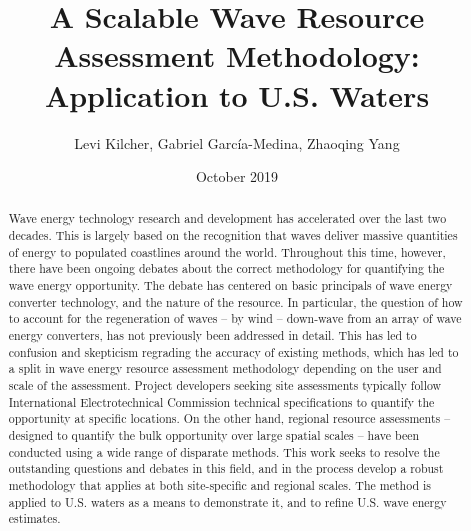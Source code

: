\documentclass[authoryear,preprint]{elsarticle}
\title{A Scalable Wave Resource Assessment Methodology: Application to U.S. Waters}
\author{Levi Kilcher, Gabriel Garc\'ia-Medina, Zhaoqing Yang}
\date{October 2019}
\begin{document}
\begin{abstract}
Wave energy technology research and development has accelerated over the last two decades. This is largely based on the recognition that waves deliver massive quantities of energy to populated coastlines around the world. Throughout this time, however, there have been ongoing debates about the correct methodology for quantifying the wave energy opportunity. The debate has centered on basic principals of wave energy converter technology, and the nature of the resource. In particular, the question of how to account for the regeneration of waves -- by wind -- down-wave from an array of wave energy converters, has not previously been addressed in detail. This has led to confusion and skepticism regrading the accuracy of existing methods, which has led to a split in wave energy resource assessment methodology depending on the user and scale of the assessment. Project developers seeking site assessments typically follow International Electrotechnical Commission technical specifications to quantify the opportunity at specific locations. On the other hand, regional resource assessments -- designed to quantify the bulk opportunity over large spatial scales -- have been conducted using a wide range of disparate methods. This work seeks to resolve the outstanding questions and debates in this field, and in the process develop a robust methodology that applies at both site-specific and regional scales. The method is applied to U.S. waters as a means to demonstrate it, and to refine U.S. wave energy estimates.
\end{abstract}

\maketitle


%




\appendix




\clearpage



\end{document}
